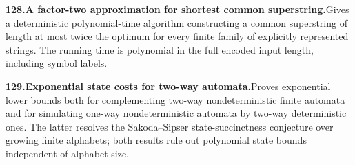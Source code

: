 \documentclass[11pt,a4paper]{article}
\begin{document}
  \par \begin{minipage}{\linewidth}
  \fontsize{10.5}{12.6}\selectfont\RaggedRight
  \hypertarget{result 128}{}
  {\bfseries\textcolor{muted}{128.}\enspace A factor-two approximation for shortest common superstring.}\enspace Gives a deterministic polynomial-time algorithm constructing a common superstring of length at most twice the optimum for every finite family of explicitly represented strings. The running time is polynomial in the full encoded input length, including symbol labels.\par
  \end{minipage}\par\vspace{5pt}



  \par \begin{minipage}{\linewidth}
  \fontsize{10.5}{12.6}\selectfont\RaggedRight
  \hypertarget{result 129}{}
  {\bfseries\textcolor{muted}{129.}\enspace Exponential state costs for two-way automata.}\enspace Proves exponential lower bounds both for complementing two-way nondeterministic finite automata and for simulating one-way nondeterministic automata by two-way deterministic ones. The latter resolves the Sakoda--Sipser state-succinctness conjecture over growing finite alphabets; both results rule out polynomial state bounds independent of alphabet size.\par
  \end{minipage}\par\vspace{5pt}
\end{document}
